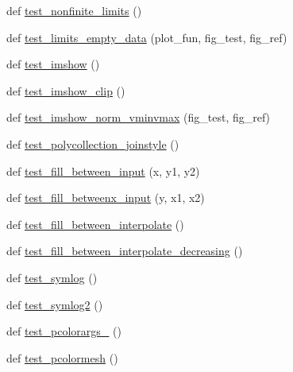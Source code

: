 \begin{DoxyCompactItemize}
\item 
def \hyperlink{namespacematplotlib_1_1tests_1_1test__axes_a7735ff057d5301ebe100430e7a944c1c}{test\+\_\+nonfinite\+\_\+limits} ()
\item 
def \hyperlink{namespacematplotlib_1_1tests_1_1test__axes_a421c17ddccfce2c944d4c0b819ba649a}{test\+\_\+limits\+\_\+empty\+\_\+data} (plot\+\_\+fun, fig\+\_\+test, fig\+\_\+ref)
\item 
def \hyperlink{namespacematplotlib_1_1tests_1_1test__axes_a63aa8460c3b404d272403db45bfe7d5d}{test\+\_\+imshow} ()
\item 
def \hyperlink{namespacematplotlib_1_1tests_1_1test__axes_a8e6defe19fb587b6b22116b8f8ca59bb}{test\+\_\+imshow\+\_\+clip} ()
\item 
def \hyperlink{namespacematplotlib_1_1tests_1_1test__axes_a81b9ae6d5d9f500130fd20a0031d7d62}{test\+\_\+imshow\+\_\+norm\+\_\+vminvmax} (fig\+\_\+test, fig\+\_\+ref)
\item 
def \hyperlink{namespacematplotlib_1_1tests_1_1test__axes_a93ec1198d511504050c6cb9c35dfa0bb}{test\+\_\+polycollection\+\_\+joinstyle} ()
\item 
def \hyperlink{namespacematplotlib_1_1tests_1_1test__axes_a958ccddbf94d94fbc7ee65ca0e320d0d}{test\+\_\+fill\+\_\+between\+\_\+input} (x, y1, y2)
\item 
def \hyperlink{namespacematplotlib_1_1tests_1_1test__axes_ab7fea8352dac505ccb711576fb253cb7}{test\+\_\+fill\+\_\+betweenx\+\_\+input} (y, x1, x2)
\item 
def \hyperlink{namespacematplotlib_1_1tests_1_1test__axes_a61c948e8626caf1e91f405dbb1edd51c}{test\+\_\+fill\+\_\+between\+\_\+interpolate} ()
\item 
def \hyperlink{namespacematplotlib_1_1tests_1_1test__axes_ad68cbcc7442959edda09df2c8c622911}{test\+\_\+fill\+\_\+between\+\_\+interpolate\+\_\+decreasing} ()
\item 
def \hyperlink{namespacematplotlib_1_1tests_1_1test__axes_a183448d4143bfb3bc780d9d8d7cf8a40}{test\+\_\+symlog} ()
\item 
def \hyperlink{namespacematplotlib_1_1tests_1_1test__axes_a7e6779f840ef075444f2a1975fe15211}{test\+\_\+symlog2} ()
\item 
def \hyperlink{namespacematplotlib_1_1tests_1_1test__axes_a6c3a1e771e7c17dcc9b7f2277afb432c}{test\+\_\+pcolorargs\+\_} ()
\item 
def \hyperlink{namespacematplotlib_1_1tests_1_1test__axes_afed3d26464b9e6a87c83954761b4dd39}{test\+\_\+pcolormesh} ()
\item 

\end{DoxyCompactItemize}
